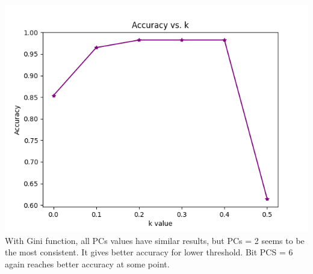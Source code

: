 \documentclass[12pt, letterpaper]{article}
\begin{document}
\begin{enumerate}[label=\Roman*.]
\begin{enumerate}[label=\arabic*.]
		\includegraphics[scale=0.5]{../images/accuracy_validation_DT_Threshold_gini_6.png} \\
		
		With Gini function, all PCs values have similar results, but PCs = 2 seems to be the most consistent. It gives better accuracy for lower threshold. Bit PCS = 6 again reaches better accuracy at some point. \\
		

\end{enumerate}
\end{enumerate}
\end{document}
